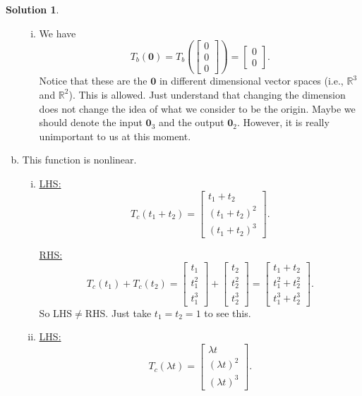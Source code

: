 \documentclass[12pt]{report} %
\newcommand{\R}{\mathbb{R}}
\theoremstyle{definition}
\newtheorem{solution}{Solution}
\begin{document}
\begin{solution}
\begin{enumerate}[(a)]
\begin{enumerate}[(i)]
    \item We have
    \[
    T_b(\mathbf{0})=T_b\left( \begin{bmatrix} 0\\0\\0\end{bmatrix}\right)=\begin{bmatrix} 0\\ 0\end{bmatrix}.
    \]
    Notice that these are the $\mathbf{0}$ in different dimensional vector spaces (i.e., $\R^3$ and $\R^2$).  This is allowed.  Just understand that changing the dimension does not change the idea of what we consider to be the origin. Maybe we should denote the input $\mathbf{0}_3$ and the output $\mathbf{0}_2$.  However, it is really unimportant to us at this moment.
    \end{enumerate}
    
    \item This function is nonlinear.
    \begin{enumerate}[(i)]
        \item \noindent\underline{LHS:} 
        \[
        T_c(t_1+t_2)=\begin{bmatrix} t_1+t_2 \\ (t_1+t_2)^2 \\ (t_1+t_2)^3 \end{bmatrix}.
        \]
        
        \noindent\underline{RHS:}
        \[
        T_c(t_1)+T_c(t_2)=\begin{bmatrix} t_1\\ t_1^2 \\ t_1^3 \end{bmatrix} + \begin{bmatrix} t_2\\ t_2^2 \\ t_2^3 \end{bmatrix} = \begin{bmatrix} t_1+t_2 \\ t_1^2+t_2^2 \\ t_1^3+t_2^3 \end{bmatrix}.
        \]
        So LHS$\neq$RHS. Just take $t_1=t_2=1$ to see this.
        
        \item \noindent\underline{LHS:}
        \[
        T_c(\lambda t)=\begin{bmatrix} \lambda t \\ (\lambda t)^2 \\ (\lambda t)^3 \end{bmatrix}.
        \]
        

\end{enumerate}
\end{enumerate}
\end{solution}
\end{document}
